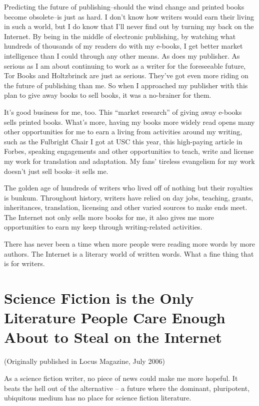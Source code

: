Predicting the future of publishing--should the wind change and
printed books become obsolete--is just as hard. I don't know how
writers would earn their living in such a world, but I do know that
I'll never find out by turning my back on the Internet. By being in
the middle of electronic publishing, by watching what hundreds of
thousands of my readers do with my e-books, I get better market
intelligence than I could through any other means. As does my
publisher. As serious as I am about continuing to work as a writer
for the foreseeable future, Tor Books and Holtzbrinck are just as
serious. They've got even more riding on the future of publishing
than me. So when I approached my publisher with this plan to give
away books to sell books, it was a no-brainer for them.

It's good business for me, too. This ``market research'' of giving
away e-books sells printed books. What's more, having my books more
widely read opens many other opportunities for me to earn a living
from activities around my writing, such as the Fulbright Chair I
got at USC this year, this high-paying article in Forbes, speaking
engagements and other opportunities to teach, write and license my
work for translation and adaptation. My fans' tireless evangelism
for my work doesn't just sell books--it sells me.

The golden age of hundreds of writers who lived off of nothing but
their royalties is bunkum. Throughout history, writers have relied
on day jobs, teaching, grants, inheritances, translation, licensing
and other varied sources to make ends meet. The Internet not only
sells more books for me, it also gives me more opportunities to
earn my keep through writing-related activities.

There has never been a time when more people were reading more
words by more authors. The Internet is a literary world of written
words. What a fine thing that is for writers.

\section{Science Fiction is the Only Literature People Care Enough About to Steal on the Internet}

(Originally published in Locus Magazine, July 2006)

As a science fiction writer, no piece of news could make me more
hopeful. It beats the hell out of the alternative -- a future where
the dominant, pluripotent, ubiquitous medium has no place for
science fiction literature.

